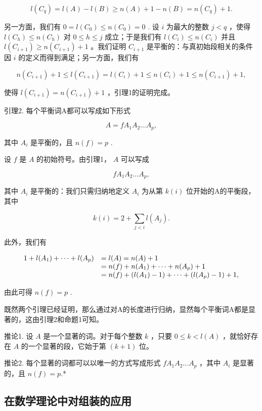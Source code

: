 \[
l (C _ {q}) = l (A) - l (B) \geqslant n (A) + 1 - n (B) = n (C _ {q}) + 1.
\]

另一方面，我们有 \(0 = l(C_0) \leqslant n(C_0) = 0\) . 设 \(i\) 为最大的整数 \(j < q\) ，使得 \(l(C_h) \leqslant n(C_h)\) 对 \(0 \leqslant h \leqslant j\) 成立；于是我们有 \(l(C_i) \leqslant n(C_i)\) 并且 \(l(C_{i+1}) \geqslant n(C_{i+1}) + 1\) 。我们证明 \(C_{i+1}\) 是平衡的：与真初始段相关的条件因 \(i\) 的定义而得到满足；另一方面，我们有

\[
n (C _ {i + 1}) + 1 \leqslant l (C _ {i + 1}) = l (C _ {i}) + 1 \leqslant n (C _ {i}) + 1 \leqslant n (C _ {i + 1}) + 1,
\]

使得 \(l(C_{i+1}) = n(C_{i+1}) + 1\) ，引理1的证明完成。

引理2. 每个平衡词A都可以写成如下形式

\[
A = f A _ {1} A _ {2} \dots A _ {p},
\]

其中 \(A_{i}\) 是平衡的，且 \(n(f) = p\) .

设 \(f\) 是 \(A\) 的初始符号。由引理1， \(A\) 可以写成

\[
f A _ {1} A _ {2} \dots A _ {p},
\]

其中 \(A_{i}\) 是平衡的：我们只需归纳地定义 \(A_{i}\) 为从第 \(k(i)\) 位开始的A的平衡段，其中

\[
k (i) = 2 + \sum_ {j <   i} l (A _ {j}).
\]

此外，我们有

\[
\begin{array}{r l} 1 + l (A _ {1}) + \dots + l (A _ {p}) & = l (A) = n (A) + 1 \\ & = n (f) + n (A _ {1}) + \dots + n (A _ {p}) + 1 \\ & = n (f) + (l (A _ {1}) - 1) + \dots + (l (A _ {p}) - 1) + 1, \end{array}
\]

由此可得 \(n(f) = p\) .

既然两个引理已经证明，那么通过对A的长度进行归纳，显然每个平衡词A都是显著的，这由引理2和命题1可知。

推论1. 设 \(A\) 是一个显著的词。对于每个整数 \(k\) ，只要 \(0 \leqslant k < l(A)\) ，就恰好存在 \(A\) 的一个显著的段，它始于第 \((k + 1)\) 位。

推论2. 每个显著的词都可以以唯一的方式写成形式 \(fA_{1}A_{2}\ldots A_{p}\) ，其中 \(A_{i}\) 是显著的，且 \(n(f) = p\).*

\subsection{在数学理论中对组装的应用}


